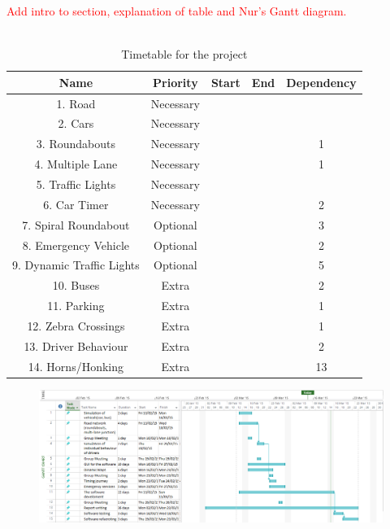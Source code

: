 \documentclass{article}
\begin{document}
\textcolor{red}{Add intro to section, explanation of table and Nur's Gantt diagram.}\\\\
\begin{table}[H]
	\centering
	\label{TimetableForTheProject}
\begin{tabular}{|c|c|c|c|c|}
	\hline {\bf Name} & {\bf Priority} & {\bf Start} & {\bf End} & {\bf Dependency} \\ 
	\hline 1. Road & Necessary &  &  &  \\ 
	\hline 2. Cars& Necessary &  &  &  \\ 
	\hline 3. Roundabouts & Necessary &  &  & 1 \\ 
	\hline 4. Multiple Lane & Necessary &  &  & 1 \\ 
	\hline 5. Traffic Lights & Necessary &  &  &  \\ 
	\hline 6.  Car Timer & Necessary &  &  & 2 \\ 
	\hline 7. Spiral Roundabout & Optional &  &  & 3 \\ 
	\hline 8. Emergency Vehicle & Optional &  &  & 2 \\ 
	\hline 9. Dynamic Traffic Lights & Optional &  &  & 5 \\ 
	\hline 10. Buses& Extra &  &  & 2 \\ 
	\hline  11. Parking & Extra &  &  & 1 \\ 
	\hline  12. Zebra Crossings & Extra &  &  & 1 \\ 
	\hline 13. Driver Behaviour & Extra &  &  & 2 \\ 
	\hline 14. Horns/Honking & Extra &  &  & 13 \\ 
	\hline 
\end{tabular} 
\caption{Timetable for the project}
\end{table}

\begin{figure}
	\centering
	\includegraphics[width=\textwidth]{"G Chart"}
\end{figure}
\end{document}
